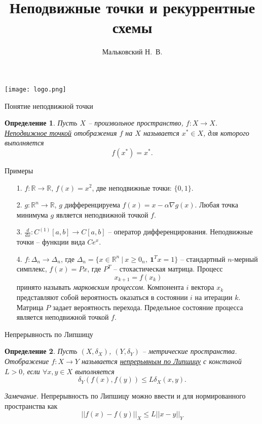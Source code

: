 \documentclass[10pt, handout]{beamer}
\author{Мальковский Н.~В.}
\title[Рекуррентные схемы]{Неподвижные точки и рекуррентные схемы}
\institute[СПбАУ]{Санкт-Петербургский Академический Университет}
\date{}
\newcounter{def}
\newtheorem{definition_ru}{Определение}[def]
\begin{document}
\begin{frame}
\titlepage
\centering
\texttt{[image: logo.png]}
\end{frame}

\begin{frame}{Понятие неподвижной точки}
\begin{definition_ru}
Пусть $X$ -- произвольное пространство, $f:X\rightarrow X$. \underline{Неподвижное точкой} отображения $f$ на $X$ называется $x^*\in X$, для которого выполняется 
$$
f(x^*)=x^*.
$$ 
\end{definition_ru}
\end{frame}

\begin{frame}{Примеры}
\pause
\begin{itemize}[<+->]
\item[1.] $f:\mathbb{R}\rightarrow \mathbb{R}$, $f(x)=x^2$, две неподвижные точки: $\{0, 1\}$.
\item[2.] $g:\mathbb{R}^n\rightarrow \mathbb{R}$, $g$ дифференцируема $f(x)=x-\alpha \nabla g(x)$. Любая точка минимума $g$ является неподвижной точкой $f$.
\item[3.] $\frac{d}{dx}:C^{(1)}[a,b]\rightarrow C[a,b]$ -- оператор дифференцирования. Неподвижные точки -- функции вида $Ce^x$.
\item[4.] $f:\Delta_n\rightarrow \Delta_n$, где $\Delta_n=\{x\in\mathbb{R}^n~|~x\geq 0_n,~\mathbf{1}^Tx=1\}$ -- стандартный $n$-мерный симплекс, $f(x)=Px$, где $P^T$ -- стохастическая матрица. Процесс
$$
x_{k+1}=f(x_k)
$$
принято называть \textit{марковским процессом}. Компонента $i$ вектора $x_k$ представляют собой вероятность оказаться в состоянии $i$ на итерации $k$. Матрица $P$ задает вероятность перехода. Предельное состояние процесса является неподвижной точкой $f$.
\end{itemize}
\end{frame}

\begin{frame}{Непрерывность по Липшицу}
\begin{definition_ru}
Пусть $(X, \delta_X)$, $(Y, \delta_Y)$ -- метрические пространства. Отображение $f:X\rightarrow Y$ называется \underline{непрерывным по Липшицу} с констаной $L>0$, если  $\forall x,y\in X$ выполняется
$$
\delta_Y(f(x), f(y))\leq L\delta_X (x, y).
$$
\end{definition_ru}
\pause
\textit{Замечание.} Непрерывность по Липшицу можно ввести и для нормированного пространства как
$$
||f(x)-f(y)||_X\leq L||x-y||_Y
$$
\end{frame}
\end{document}
